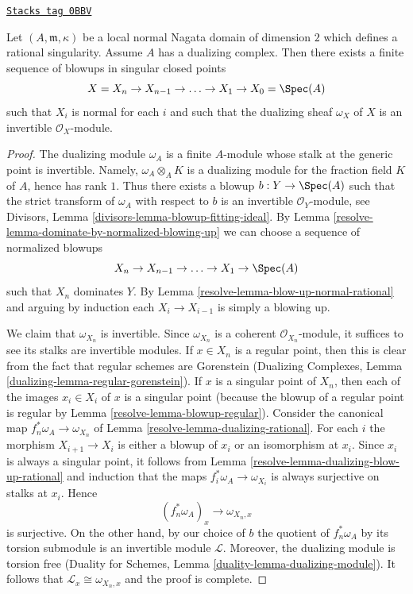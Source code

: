 \begin{lemma}
\label{resolve-lemma-rational-to-gorenstein}
\href{https://stacks.math.columbia.edu/tag/0BBV}{\texttt{Stacks tag 0BBV}}

Let $(A, \mathfrak m, \kappa)$ be a local normal Nagata domain of
dimension $2$ which defines a rational singularity. Assume $A$ has
a dualizing complex. Then there exists a finite sequence of blowups in
singular closed points
$$
X = X_n \to X_{n - 1} \to \ldots \to X_1 \to X_0 = \Spec(A)
$$
such that $X_i$ is normal for each $i$ and such that
the dualizing sheaf $\omega_X$ of $X$ is an invertible
$\mathcal{O}_X$-module.
\end{lemma}

\begin{proof}

The dualizing module $\omega_A$ is a finite $A$-module whose stalk at
the generic point is invertible. Namely, $\omega_A \otimes_A K$
is a dualizing module for the fraction field $K$ of $A$, hence has
rank $1$. Thus there exists a blowup $b : Y \to \Spec(A)$ such that
the strict transform of $\omega_A$ with respect to $b$ is an invertible
$\mathcal{O}_Y$-module, see
Divisors, Lemma \ref{divisors-lemma-blowup-fitting-ideal}.
By Lemma \ref{resolve-lemma-dominate-by-normalized-blowing-up}
we can choose a sequence of normalized blowups
$$
X_n \to X_{n - 1} \to \ldots \to X_1 \to \Spec(A)
$$
such that $X_n$ dominates $Y$. By Lemma \ref{resolve-lemma-blow-up-normal-rational}
and arguing by induction each $X_i \to X_{i - 1}$ is simply a blowing up.

\medskip\noindent
We claim that $\omega_{X_n}$ is invertible. Since $\omega_{X_n}$
is a coherent $\mathcal{O}_{X_n}$-module, it suffices to see its stalks
are invertible modules. If $x \in X_n$ is a regular point, then this is
clear from the fact that regular schemes are
Gorenstein (Dualizing Complexes, Lemma
\ref{dualizing-lemma-regular-gorenstein}). If $x$ is a singular point of
$X_n$, then each of the images $x_i \in X_i$ of $x$ is a singular point
(because the blowup of a regular point is regular by
Lemma \ref{resolve-lemma-blowup-regular}).
Consider the canonical map $f_n^*\omega_A \to \omega_{X_n}$ of
Lemma \ref{resolve-lemma-dualizing-rational}. For each $i$ the morphism
$X_{i + 1} \to X_i$ is either a blowup of $x_i$ or an isomorphism
at $x_i$. Since $x_i$ is always a singular point, it follows from
Lemma \ref{resolve-lemma-dualizing-blow-up-rational}
and induction that the maps $f_i^*\omega_A \to \omega_{X_i}$
is always surjective on stalks at $x_i$. Hence
$$
(f_n^*\omega_A)_x \longrightarrow \omega_{X_n, x}
$$
is surjective. On the other hand, by our choice of $b$ the quotient
of $f_n^*\omega_A$ by its torsion submodule is an invertible module
$\mathcal{L}$. Moreover, the dualizing module is torsion free
(Duality for Schemes, Lemma \ref{duality-lemma-dualizing-module}).
It follows that $\mathcal{L}_x \cong  \omega_{X_n, x}$ and the proof is
complete.
\end{proof}

